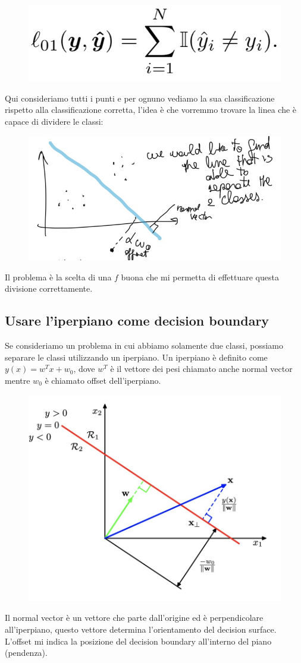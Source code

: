 \documentclass[14pt]{extreport}
\begin{document}
\begin{figure}[H]
	\centering
	\includegraphics[width=0.4\linewidth]{142.jpeg}
\end{figure}

Qui consideriamo tutti i punti e per ognuno vediamo la sua classificazione rispetto alla classificazione corretta, l'idea è che vorremmo trovare la
linea che è capace di dividere le classi:

\begin{figure}[H]
	\centering
	\includegraphics[width=0.4\linewidth]{143.jpeg}
\end{figure}

Il problema è la scelta di una $f$ buona che mi permetta di effettuare questa divisione correttamente.

\subsection{Usare l'iperpiano come decision boundary}

Se consideriamo un problema in cui abbiamo solamente due classi, possiamo separare le classi utilizzando un iperpiano. Un iperpiano è definito come
$y(x) = w^Tx + w_0$, dove $w^T$ è il vettore dei pesi chiamato anche normal vector mentre $w_0$ è chiamato offset dell'iperpiano.

\begin{figure}[H]
	\centering
	\includegraphics[width=0.4\linewidth]{144.jpeg}
\end{figure}

Il normal vector è un vettore che parte dall'origine ed è perpendicolare all'iperpiano, questo vettore determina l'orientamento del decision surface.
L'offset mi indica la posizione del decision boundary all'interno del piano (pendenza).
\end{document}
